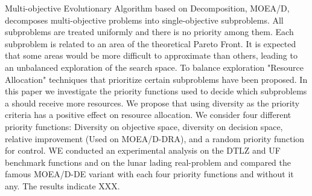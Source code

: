 Multi-objective Evolutionary Algorithm based on Decomposition, MOEA/D, decomposes multi-objective problems into single-objective subproblems. All subproblems are treated uniformly and there is no priority among them. Each subproblem is related to an area of the theoretical Pareto Front. It is expected that some areas would be more difficult to approximate than others, leading to an unbalanced exploration of the search space. To balance exploration "Resource Allocation" techniques that prioritize certain subproblems have been proposed. In this paper we investigate the priority functions used to decide  which subproblems a should receive more resources. We propose that using diversity as the priority criteria has a positive effect on resource allocation. We consider four different priority functions: Diversity on objective space, diversity on decision space, relative improvement (Used on MOEA/D-DRA), and a random priority function for control. WE conducted an experimental analysis on the DTLZ and UF benchmark functions and on the lunar lading real-problem and compared the famous MOEA/D-DE variant with each four priority functions and without it any. The results indicate XXX.